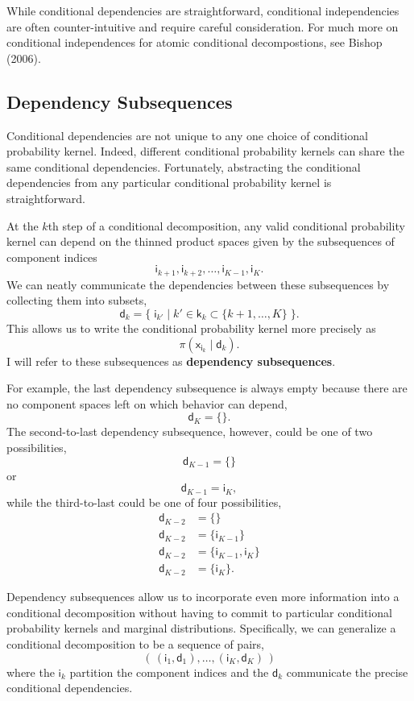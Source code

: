 \documentclass[
  letterpaper,
  DIV=11,
  numbers=noendperiod]{scrartcl}
\begin{document}
While conditional dependencies are straightforward, conditional
independencies are often counter-intuitive and require careful
consideration. For much more on conditional independences for atomic
conditional decompostions, see Bishop (2006).

\subsection{Dependency Subsequences}\label{dependency-subsequences}

Conditional dependencies are not unique to any one choice of conditional
probability kernel. Indeed, different conditional probability kernels
can share the same conditional dependencies. Fortunately, abstracting
the conditional dependencies from any particular conditional probability
kernel is straightforward.

At the \(k\)th step of a conditional decomposition, any valid
conditional probability kernel can depend on the thinned product spaces
given by the subsequences of component indices \[
\mathsf{i}_{k + 1}, \mathsf{i}_{k + 2}, \ldots,
\mathsf{i}_{K - 1}, \mathsf{i}_{K}.
\] We can neatly communicate the dependencies between these subsequences
by collecting them into subsets, \[
\mathsf{d}_{k}
=
\{ \;
  \mathsf{i}_{k'} \mid
   k' \in \mathsf{k}_{k} \subset \{ k + 1, \ldots, K \}
\; \}.
\] This allows us to write the conditional probability kernel more
precisely as \[
\pi( \mathsf{x}_{ \mathsf{i}_{k} } \mid \mathsf{d}_{k} ).
\] I will refer to these subsequences as \textbf{dependency
subsequences}.

For example, the last dependency subsequence is always empty because
there are no component spaces left on which behavior can depend, \[
\mathsf{d}_{K} = \{ \}.
\] The second-to-last dependency subsequence, however, could be one of
two possibilities, \[
\mathsf{d}_{K - 1} = \{ \}
\] or \[
\mathsf{d}_{K - 1} = \mathsf{i}_{K},
\] while the third-to-last could be one of four possibilities,
\begin{align*}
\mathsf{d}_{K - 2} &= \{ \}
\\
\mathsf{d}_{K - 2} &= \{ \mathsf{i}_{K - 1} \}
\\
\mathsf{d}_{K - 2}
&=
\{ \mathsf{i}_{K - 1}, \mathsf{i}_{K} \}
\\
\mathsf{d}_{K - 2} &= \{ \mathsf{i}_{K} \}.
\end{align*}

Dependency subsequences allow us to incorporate even more information
into a conditional decomposition without having to commit to particular
conditional probability kernels and marginal distributions.
Specifically, we can generalize a conditional decomposition to be a
sequence of pairs, \[
( \,
  ( \mathsf{i}_{1}, \mathsf{d}_{1}), \ldots,
  ( \mathsf{i}_{K}, \mathsf{d}_{K} )
\, )
\] where the \(\mathsf{i}_{k}\) partition the component indices and the
\(\mathsf{d}_{k}\) communicate the precise conditional dependencies.
\end{document}
